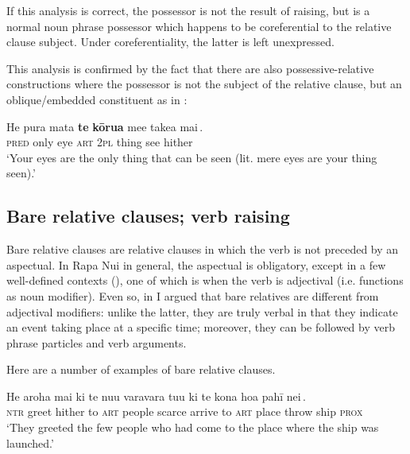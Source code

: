 If this analysis is correct, the possessor is not the result of raising, but is a normal noun phrase possessor which happens to be coreferential to the relative clause subject. Under coreferentiality, the latter is left unexpressed. 

This analysis is confirmed by the fact that there are also possessive-relative constructions where the possessor is not the subject of the relative clause, but an oblique/embed\-ded constituent as in :

\largerpage

\ea\label{ex:11.128}
\gll He pura mata \textbf{te} \textbf{kōrua} me{\ꞌ}e {\ob}take{\ꞌ}a mai\,{\cb}. \\
\textsc{pred} only eye \textsc{art} \textsc{2pl} thing {\db}see hither \\

\glt 
‘Your eyes are the only thing that can be seen (lit. mere eyes are your thing seen).’ \textstyleExampleref{[R245.217]}\textstyleExampleref{} 
\z
{}
\subsection{Bare relative clauses; verb raising}\label{sec:11.4.5}
Bare relative clauses are relative clauses in which the verb is not preceded by an aspectual. In Rapa Nui in general, the aspectual is obligatory, except in a few well-defined contexts (), one of which is when the verb is adjectival (i.e. functions as noun modifier). Even so, in  I argued that bare relatives are different from adjectival modifiers: unlike the latter, they are truly verbal in that they indicate an event taking place at a specific time; moreover, they can be followed by verb phrase particles and verb arguments. 

Here are a number of examples of bare relative clauses.

\ea\label{ex:11.129}
\gll He {\ꞌ}aroha mai ki te nu{\ꞌ}u varavara {\ob}tu{\ꞌ}u ki te kona hoa pahī nei\,{\cb}. \\
\textsc{ntr} greet hither to \textsc{art} people scarce {\db}arrive to \textsc{art} place throw ship \textsc{prox} \\

\glt 
‘They greeted the few people who had come to the place where the ship was launched.’ \textstyleExampleref{[R250.235]} 
\z

